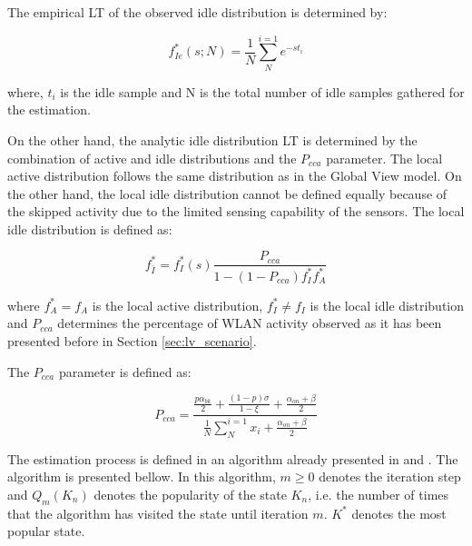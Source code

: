 The empirical \acs{LT} of the observed idle distribution is determined by:

\begin{equation}
f_{Ie}^{*}(s;N)=\frac{1}{N}\sum_{N}^{i=1}e^{-st_i}
\label{eq:emp_LT}
\end{equation}

where, $t_i$ is the idle sample and N is the total number of idle samples gathered for the estimation.

On the other hand, the analytic idle distribution \acs{LT} is determined by the combination of active and idle distributions and the $P_{cca}$ parameter. The local active distribution follows the same distribution as in the Global View model. On the other hand, the local idle distribution cannot be defined equally because of the skipped activity due to the limited sensing capability of the sensors. The local idle distribution is defined as:

\begin{equation}
f_{\bar{I}}^{*}=f_I^{*}(s)\frac{P_{cca}}{1-(1-P_{cca})f_I^{*}f_A^{*}}
\label{eq:analytic_LT}
\end{equation}

where $f_A^{*} = f_A$ is the local active distribution, $f_I^{*} \neq f_I$ is the local idle distribution and $P_{cca}$ determines the percentage of \acs{WLAN} activity observed as it has been presented before in Section \ref{sec:lv_scenario}.

The $P_{cca}$ parameter is defined as:

\begin{equation}
P_{cca} = \frac{\frac{p\alpha_{bk}}{2}+\frac{(1-p)\sigma}{1-\xi}+\frac{\alpha_{on}+\beta}{2}}{\frac{1}{N}\sum_{N}^{i=1}x_i+\frac{\alpha_{on}+\beta}{2}}
\label{eq:pcca}
\end{equation}

The estimation process is defined in an algorithm already presented in \cite{marcello} and \cite{ioannis_laplace}. The algorithm is presented bellow. In this algorithm, $m \geq 0$ denotes the iteration step and $Q_m(K_n)$ denotes the popularity of the state $K_n$, i.e. the number of times that the algorithm has visited the state until iteration $m$. $K^{*}$ denotes the most popular state.

